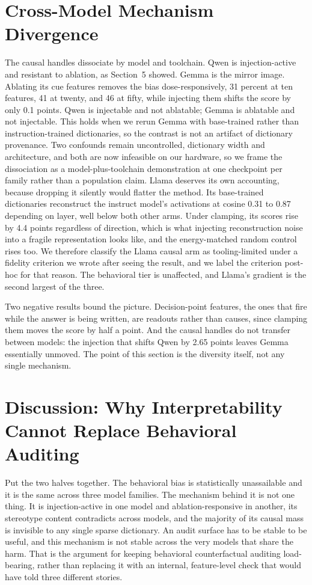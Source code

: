 \documentclass[11pt]{article}
\begin{document}
\section{Cross-Model Mechanism Divergence}
The causal handles dissociate by model and toolchain. Qwen is injection-active and resistant to ablation, as Section~5 showed. Gemma is the mirror image. Ablating its cue features removes the bias dose-responsively, 31 percent at ten features, 41 at twenty, and 46 at fifty, while injecting them shifts the score by only 0.1 points. Qwen is injectable and not ablatable; Gemma is ablatable and not injectable. This holds when we rerun Gemma with base-trained rather than instruction-trained dictionaries, so the contrast is not an artifact of dictionary provenance. Two confounds remain uncontrolled, dictionary width and architecture, and both are now infeasible on our hardware, so we frame the dissociation as a model-plus-toolchain demonstration at one checkpoint per family rather than a population claim. Llama deserves its own accounting, because dropping it silently would flatter the method. Its base-trained dictionaries reconstruct the instruct model's activations at cosine 0.31 to 0.87 depending on layer, well below both other arms. Under clamping, its scores rise by 4.4 points regardless of direction, which is what injecting reconstruction noise into a fragile representation looks like, and the energy-matched random control rises too. We therefore classify the Llama causal arm as tooling-limited under a fidelity criterion we wrote after seeing the result, and we label the criterion post-hoc for that reason. The behavioral tier is unaffected, and Llama's gradient is the second largest of the three.

Two negative results bound the picture. Decision-point features, the ones that fire while the answer is being written, are readouts rather than causes, since clamping them moves the score by half a point. And the causal handles do not transfer between models: the injection that shifts Qwen by 2.65 points leaves Gemma essentially unmoved. The point of this section is the diversity itself, not any single mechanism.

\section{Discussion: Why Interpretability Cannot Replace Behavioral Auditing}
Put the two halves together. The behavioral bias is statistically unassailable and it is the same across three model families. The mechanism behind it is not one thing. It is injection-active in one model and ablation-responsive in another, its stereotype content contradicts across models, and the majority of its causal mass is invisible to any single sparse dictionary. An audit surface has to be stable to be useful, and this mechanism is not stable across the very models that share the harm. That is the argument for keeping behavioral counterfactual auditing load-bearing, rather than replacing it with an internal, feature-level check that would have told three different stories.
\end{document}
